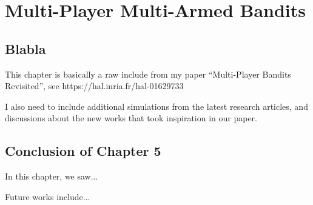 
\chapter{Multi-Player Multi-Armed Bandits}
\label{chapter:5}
\minitoc
\newpage
\graphicspath{{2-Chapters/5-Chapter/Images/}}

\section{Blabla}
\label{sec:blabla}

This chapter is basically a raw include from my paper ``Multi-Player Bandits Revisited'', see https://hal.inria.fr/hal-01629733

I also need to include additional simulations from the latest research articles, and discussions about the new works that took inspiration in our paper.


\section{Conclusion of Chapter 5}
\label{sec:5:conclusion}

In this chapter, we saw...

Future works include...

